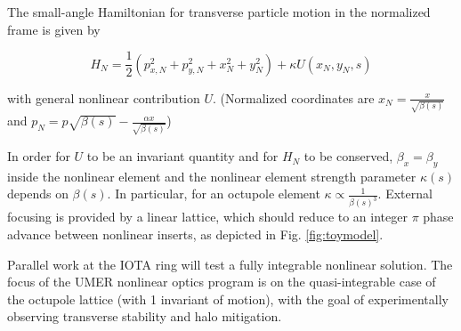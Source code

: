 The small-angle Hamiltonian for transverse particle motion in the normalized frame is given by

\begin{equation}
H_N = \frac{1}{2} \left( p_{x,N}^2 + p_{y,N}^2 +x_N^2 + y_N^2 \right) + \kappa U(x_N,y_N,s)
\end{equation}

with general nonlinear contribution $U$. (Normalized coordinates are $x_N = \frac{x}{\sqrt{\beta(s)}}$ and $p_N = p\sqrt{\beta(s)}-\frac{\alpha x}{\sqrt{\beta(s)}}$)

In order for $U$ to be an invariant quantity and for $H_N$ to be conserved, $\beta_x=\beta_y$ inside the nonlinear element and the nonlinear element strength parameter $\kappa (s)$ depends on $\beta (s)$. In particular, for an octupole element $\kappa \propto \frac{1}{\beta(s)^3}$. External focusing is provided by a linear lattice, which should reduce to an integer $\pi$ phase advance between nonlinear inserts, as depicted in Fig. \ref{fig:toymodel}. 

Parallel work at the IOTA ring \cite{antipov} will test a fully integrable nonlinear solution. The focus of the UMER nonlinear optics program is on the quasi-integrable case of the octupole lattice (with 1 invariant of motion), with the goal of experimentally observing transverse stability and halo mitigation. 
